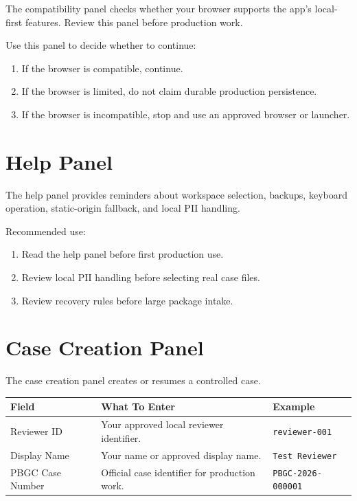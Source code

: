 The compatibility panel checks whether your browser supports the app's local-first features. Review this panel before production work.

Use this panel to decide whether to continue:

\begin{enumerate}
  \item If the browser is compatible, continue.
  \item If the browser is limited, do not claim durable production persistence.
  \item If the browser is incompatible, stop and use an approved browser or launcher.
\end{enumerate}

\section{Help Panel}

The help panel provides reminders about workspace selection, backups, keyboard operation, static-origin fallback, and local PII handling.

Recommended use:

\begin{enumerate}
  \item Read the help panel before first production use.
  \item Review local PII handling before selecting real case files.
  \item Review recovery rules before large package intake.
\end{enumerate}

\section{Case Creation Panel}

The case creation panel creates or resumes a controlled case.

\begin{longtable}{L{0.25\textwidth}L{0.45\textwidth}L{0.20\textwidth}}
\toprule
\textbf{Field} & \textbf{What To Enter} & \textbf{Example} \\
\midrule
Reviewer ID & Your approved local reviewer identifier. & \texttt{reviewer-001} \\
Display Name & Your name or approved display name. & \texttt{Test Reviewer} \\
PBGC Case Number & Official case identifier for production work. & \texttt{PBGC-2026-000001} \\
\bottomrule
\end{longtable}

